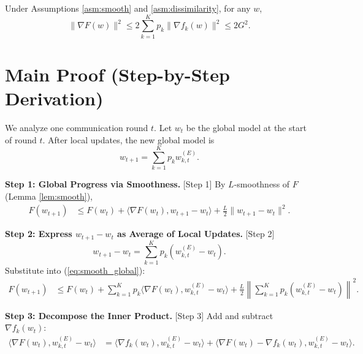 \documentclass{article}
\begin{document}
\begin{lemma} \label{lem:grad_bound}
    Under Assumptions \ref{asm:smooth} and \ref{asm:dissimilarity}, for any $w$,
    \begin{equation}
        \| \nabla F(w) \|^2 \leq 2 \sum_{k=1}^K p_k \| \nabla f_k(w) \|^2 \leq 2G^2.
    \end{equation}
\end{lemma}

\section*{Main Proof (Step-by-Step Derivation)}

We analyze one communication round $t$. Let $w_t$ be the global model at the start of round $t$. After local updates, the new global model is
\begin{equation}
    w_{t+1} = \sum_{k=1}^K p_k w_{k,t}^{(E)}.
\end{equation}

\textbf{Step 1: Global Progress via Smoothness.} [Step 1]
By $L$-smoothness of $F$ (Lemma \ref{lem:smooth}),
\begin{align}
    F(w_{t+1}) &\leq F(w_t) + \langle \nabla F(w_t), w_{t+1} - w_t \rangle + \frac{L}{2} \| w_{t+1} - w_t \|^2. \label{eq:smooth_global}
\end{align}

\textbf{Step 2: Express $w_{t+1} - w_t$ as Average of Local Updates.} [Step 2]
\begin{equation}
    w_{t+1} - w_t = \sum_{k=1}^K p_k (w_{k,t}^{(E)} - w_t).
\end{equation}
Substitute into (\ref{eq:smooth_global}):
\begin{align}
    F(w_{t+1}) &\leq F(w_t) + \sum_{k=1}^K p_k \langle \nabla F(w_t), w_{k,t}^{(E)} - w_t \rangle + \frac{L}{2} \left\| \sum_{k=1}^K p_k (w_{k,t}^{(E)} - w_t) \right\|^2. \label{eq:global_progress}
\end{align}

\textbf{Step 3: Decompose the Inner Product.} [Step 3]
Add and subtract $\nabla f_k(w_t)$:
\begin{align}
    \langle \nabla F(w_t), w_{k,t}^{(E)} - w_t \rangle &= \langle \nabla f_k(w_t), w_{k,t}^{(E)} - w_t \rangle + \langle \nabla F(w_t) - \nabla f_k(w_t), w_{k,t}^{(E)} - w_t \rangle. \label{eq:inner_decomp}
\end{align}
\end{document}

